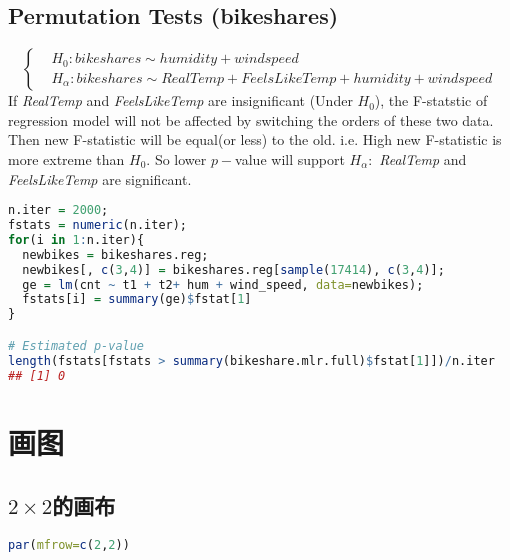 \documentclass[11pt,a4paper]{article}
\begin{document}
\subsection{Permutation Tests (bikeshares)}
\[\begin{cases}
    &H_0: bikeshares \sim humidity + windspeed\\
    &H_{\alpha}: bikeshares \sim RealTemp + FeelsLikeTemp + humidity + windspeed
    \end{cases}\]
If \textit{RealTemp} and \textit{FeelsLikeTemp} are insignificant (Under $H_0$), the F-statstic of regression model will not be affected by switching the orders of these two data. Then new F-statistic will be equal(or less) to the old. i.e. High new F-statistic is more extreme than $H_0$. So lower $p-$value will support $H_\alpha:$ \textit{RealTemp} and \textit{FeelsLikeTemp} are significant.
\begin{lstlisting}[language=R]
n.iter = 2000;
fstats = numeric(n.iter);
for(i in 1:n.iter){
  newbikes = bikeshares.reg;
  newbikes[, c(3,4)] = bikeshares.reg[sample(17414), c(3,4)];
  ge = lm(cnt ~ t1 + t2+ hum + wind_speed, data=newbikes);
  fstats[i] = summary(ge)$fstat[1]
}

# Estimated p-value
length(fstats[fstats > summary(bikeshare.mlr.full)$fstat[1]])/n.iter
## [1] 0
\end{lstlisting}










































\section{画图}

\subsection{$2\times2$的画布}
\begin{lstlisting}[language=R]
par(mfrow=c(2,2))
\end{lstlisting}
\end{document}
